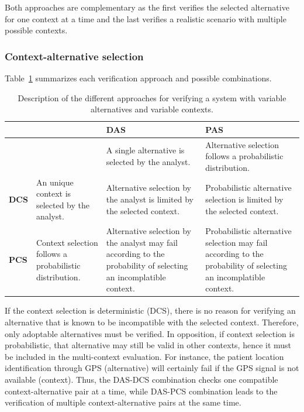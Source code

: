 Both approaches are complementary as the first verifies the selected alternative for one context at a time and the last verifies a realistic scenario with multiple possible contexts. 

\subsubsection{Context-alternative selection}

Table~\ref{tab:DAS_PAS_DCS_PCS} summarizes each verification approach and possible combinations.

\begin{table}[h]\label{tab:DAS_PAS_DCS_PCS}
{\renewcommand{\arraystretch}{1.5}
\begin{tabularx}{\textwidth}{@{}l|XXX@{}}
\toprule
             &                                                         & \textbf{DAS}                                                                                                      & \textbf{PAS}                                                                                                     \\ \midrule
             &                                                         & A single alternative is selected by the analyst.                                                                  & Alternative selection follows a probabilistic distribution.                                                      \\
\textbf{DCS} & An unique context is selected by the analyst.           & Alternative selection by the analyst is limited by the selected context.                                          & Probabilistic alternative selection is limited by the selected context.                                          \\
\textbf{PCS} & Context selection follows a probabilistic distribution. & Alternative selection by the analyst may fail according to the probability of selecting an incomplatible context. & Probabilistic alternative selection may fail according to the probability of selecting an incomplatible context. \\ \bottomrule
\end{tabularx}
}
\caption{Description of the different approaches for verifying a system with variable alternatives and variable contexts.}
\end{table}

If the context selection is deterministic (DCS), there is no reason for verifying an alternative that is known to be incompatible with the selected context. Therefore, only adoptable alternatives must be verified. In opposition, if context selection is probabilistic, that alternative may still be valid in other contexts, hence it must be included in the multi-context evaluation. For instance, the patient location identification through GPS (alternative) will certainly fail if the GPS signal is not available (context). Thus, the DAS-DCS combination checks one compatible context-alternative pair at a time, while DAS-PCS combination leads to the verification of multiple context-alternative pairs at the same time.

